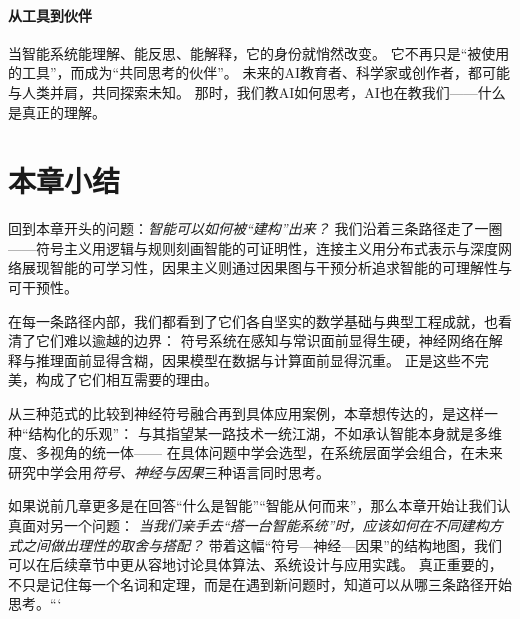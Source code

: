 \paragraph{从工具到伙伴}
当智能系统能理解、能反思、能解释，它的身份就悄然改变。  
它不再只是“被使用的工具”，而成为“共同思考的伙伴”。  
未来的AI教育者、科学家或创作者，都可能与人类并肩，共同探索未知。  
那时，我们教AI如何思考，AI也在教我们——什么是真正的理解。

\section{本章小结}

回到本章开头的问题：\emph{智能可以如何被“建构”出来？}  
我们沿着三条路径走了一圈——符号主义用逻辑与规则刻画智能的可证明性，连接主义用分布式表示与深度网络展现智能的可学习性，因果主义则通过因果图与干预分析追求智能的可理解性与可干预性。

在每一条路径内部，我们都看到了它们各自坚实的数学基础与典型工程成就，也看清了它们难以逾越的边界：  
符号系统在感知与常识面前显得生硬，神经网络在解释与推理面前显得含糊，因果模型在数据与计算面前显得沉重。  
正是这些不完美，构成了它们相互需要的理由。
 
从三种范式的比较到神经符号融合再到具体应用案例，本章想传达的，是这样一种“结构化的乐观”：  
与其指望某一路技术一统江湖，不如承认智能本身就是多维度、多视角的统一体——  
在具体问题中学会选型，在系统层面学会组合，在未来研究中学会用\emph{符号、神经与因果}三种语言同时思考。

如果说前几章更多是在回答“什么是智能”“智能从何而来”，那么本章开始让我们认真面对另一个问题：  
\emph{当我们亲手去“搭一台智能系统”时，应该如何在不同建构方式之间做出理性的取舍与搭配？}  
带着这幅“符号—神经—因果”的结构地图，我们可以在后续章节中更从容地讨论具体算法、系统设计与应用实践。  
真正重要的，不只是记住每一个名词和定理，而是在遇到新问题时，知道可以从哪三条路径开始思考。```
